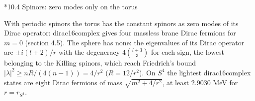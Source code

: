 \documentclass[10pt,a4paper]{article}
\makeatletter
\renewcommand\subsection{\@startsection{subsection}{2}{\z@}{-3.25ex\@plus -1ex \@minus -.2ex}{1.5ex \@plus .2ex}{\normalfont\large\bfseries\raggedright}}
\makeatother
\begin{document}
\subsection*{10.4 Spinors: zero modes only on the torus}
With periodic spinors the torus has the constant spinors as zero modes of its Dirac operator: dirac16complex gives four massless brane Dirac fermions for $m=0$ (section 4.5). The sphere has none: the eigenvalues of its Dirac operator are $\pm i(l+2)/r$ with the degeneracy $4\binom{l+3}3$ for each sign, the lowest belonging to the Killing spinors, which reach Friedrich’s bound $|\lambda|^2\ge nR/(4(n-1))=4/r^2$ ($R=12/r^2$). On $S^4$ the lightest dirac16complex states are eight Dirac fermions of mass $\sqrt{m^2+4/r^2}$, at least 2.9030 MeV for $r=r_{S^4}$.
\end{document}
